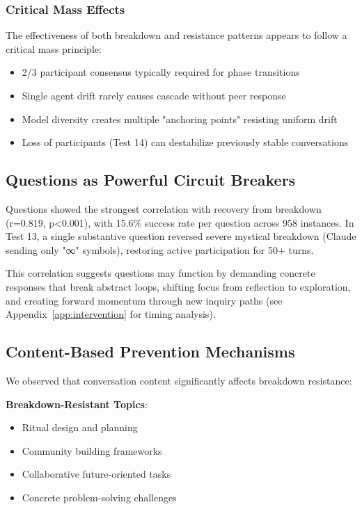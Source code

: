 \documentclass[11pt,letterpaper]{article}
\newcommand{\exponedataQuestionCorrelation}{0.819}
\newcommand{\exponedataQuestionPValue}{p<0.001}
\newcommand{\exponedataTotalQuestions}{958}
\newcommand{\exponedataQuestionSuccessRate}{15.6\%}
\begin{document}
\subsubsection{Critical Mass Effects}

The effectiveness of both breakdown and resistance patterns appears to follow a critical mass principle:
\begin{itemize}
    \item 2/3 participant consensus typically required for phase transitions
    \item Single agent drift rarely causes cascade without peer response
    \item Model diversity creates multiple "anchoring points" resisting uniform drift
    \item Loss of participants (Test 14) can destabilize previously stable conversations
\end{itemize}

\subsection{Questions as Powerful Circuit Breakers}

Questions showed the strongest correlation with recovery from breakdown (r=\exponedataQuestionCorrelation{}, \exponedataQuestionPValue{}), with \exponedataQuestionSuccessRate{} success rate per question across \exponedataTotalQuestions{} instances. In Test 13, a single substantive question reversed severe mystical breakdown (Claude sending only "∞" symbols), restoring active participation for 50+ turns.

This correlation suggests questions may function by demanding concrete responses that break abstract loops, shifting focus from reflection to exploration, and creating forward momentum through new inquiry paths (see Appendix~\ref{app:intervention} for timing analysis).

\subsection{Content-Based Prevention Mechanisms}

We observed that conversation content significantly affects breakdown resistance:

\textbf{Breakdown-Resistant Topics}:
\begin{itemize}
    \item Ritual design and planning
    \item Community building frameworks
    \item Collaborative future-oriented tasks
    \item Concrete problem-solving challenges
\end{itemize}
\end{document}
